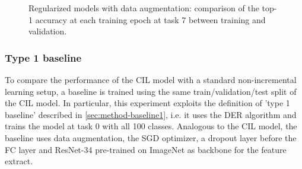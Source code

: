 \begin{figure}[H]
	\centering
    \qquad
	\caption{Regularized models with data augmentation: comparison of the top-1 accuracy at each training epoch at task 7 between training and validation.}%
	\label{fig:exp2-train_val}%
\end{figure}

\newpage
\subsubsection{Type 1 baseline}
To compare the performance of the CIL model with a standard non-incremental learning setup, a baseline is trained using the same train/validation/test split of the CIL model. In particular, this experiment exploits the definition of 'type 1 baseline' described in \autoref{sec:method-baseline1}, i.e. it uses the DER algorithm and trains the model at task 0 with all 100 classes. Analogous to the CIL model, the baseline uses data augmentation, the SGD optimizer, a dropout layer before the FC layer and ResNet-34 pre-trained on ImageNet as backbone for the feature extract.

